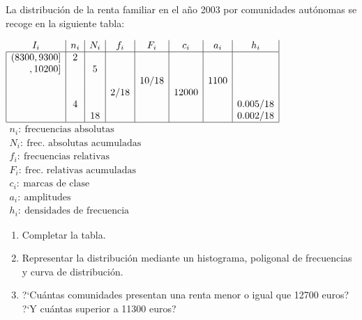 \documentclass[hidequestions]{homework}
\begin{document}
	\color{black}
	
	
	
	
	\problem
	\color{blue}
	La distribuci{\'o}n de la renta familiar  en el a{\~n}o 2003 por comunidades aut{\'o}nomas se recoge en la
	siguiente tabla:
	
	$\begin{array}{|r|c|c|c|c|c|c|c|}
	\multicolumn{1}{c|}{I_{i}} & n_{i} & N_{i} & f_{i} & F_{i} & c_{i} & a_{i} & h_{i} \\
	\hline
	(8300,9300] & 2 &  &  &  &  &  &  \\
	,10200] &  & 5 &  &  &  &  &  \\
	&  &  &  & 10/18 &  & 1100 &  \\
	&  &  & 2/18 &  & 12000 &  &  \\
	& 4 &  &  &  &  &  & 0\mbox{.}005/18 \\
	&  & 18 &  &  &  &  & 0\mbox{.}002/18 \\  \hline
	\end{array}$ \hskip 1cm $\begin{array}{l}  n_i: \ \mbox{frecuencias absolutas} \\ N_i:  \ \mbox{frec. absolutas acumuladas}\\ f_i:  \ \mbox{frecuencias relativas}
	\\ F_i:  \ \mbox{frec. relativas acumuladas}\\ c_i:  \ \mbox{marcas de clase}\\ a_i:  \ \mbox{amplitudes} \\ h_i:  \ \mbox{densidades de frecuencia}\end{array}$
	\begin{enumerate}
		\item Completar la tabla.
		\item Representar la distribuci{\'o}n mediante un histograma,
		poligonal de frecuencias y curva de distribuci{\'o}n.
		\item ?`Cu{\'a}ntas comunidades presentan una renta menor o igual
		que 12700 euros? ?`Y cu{\'a}ntas superior a 11300 euros? \\
	\end{enumerate}
	
	\color{black}
	
	
	
	
\end{document}
